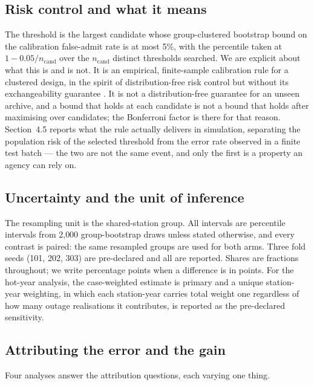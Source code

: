 \documentclass[draft]{agujournal2025}
\begin{document}
\subsection{Risk control and what it means}

The threshold is the largest candidate whose group-clustered bootstrap bound on
the calibration false-admit rate is at most 5\%, with the percentile taken at
$1-0.05/n_{\mathrm{cand}}$ over the $n_{\mathrm{cand}}$ distinct thresholds
searched. We are explicit about what this is and is not. It is an empirical,
finite-sample calibration rule for a clustered design, in the spirit of
distribution-free risk control but without its exchangeability guarantee
\cite{angelopoulos2022,bai2026}. It is not a
distribution-free guarantee for an unseen archive, and a bound that holds at
each candidate is not a bound that holds after maximising over candidates; the
Bonferroni factor is there for that reason. Section~4.5 reports what the rule
actually delivers in simulation, separating the population risk of the selected
threshold from the error rate observed in a finite test batch --- the two are not
the same event, and only the first is a property an agency can rely on.

\subsection{Uncertainty and the unit of inference}

The resampling unit is the shared-station group. All intervals are percentile
intervals from 2{,}000 group-bootstrap draws unless stated otherwise, and every
contrast is paired: the same resampled groups are used for both arms. Three fold
seeds (101, 202, 303) are pre-declared and all are reported. Shares are fractions
throughout; we write percentage points when a difference is in points. For the
hot-year analysis, the case-weighted estimate is primary and a unique
station-year weighting, in which each station-year carries total weight one
regardless of how many outage realisations it contributes, is reported as the
pre-declared sensitivity.

\subsection{Attributing the error and the gain}

Four analyses answer the attribution questions, each varying one thing.
\end{document}
